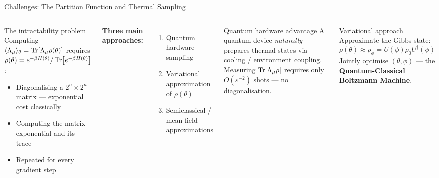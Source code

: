 \documentclass[aspectratio=169,10pt]{beamer}
\begin{document}
\begin{frame}{Challenges: The Partition Function and Thermal Sampling}
  \begin{columns}[T]
      \begin{alertblock}{The intractability problem}
        Computing $\langle\Lambda_\mu\rangle_\theta=\Tr[\Lambda_\mu\rho(\theta)]$
        requires $\rho(\theta)=e^{-\beta H(\theta)}/\Tr[e^{-\beta H(\theta)}]$:
        \begin{itemize}\itemsep0pt
          \item Diagonalising a $2^n\times 2^n$ matrix —
                exponential cost classically
          \item Computing the matrix exponential and its trace
          \item Repeated for every gradient step
        \end{itemize}
      \end{alertblock}
      \textbf{Three main approaches:}
      \begin{enumerate}\itemsep0pt
        \item Quantum hardware sampling
        \item Variational approximation of $\rho(\theta)$
        \item Semiclassical / mean-field approximations
      \end{enumerate}
      \begin{block}{Quantum hardware advantage}
        A quantum device \emph{naturally} prepares thermal
        states via cooling / environment coupling.
        Measuring $\Tr[\Lambda_\mu\rho]$ requires only
        $O(\varepsilon^{-2})$ shots — no diagonalisation.
      \end{block}
      \vspace{0.1cm}
      \begin{block}{Variational approach}
        Approximate the Gibbs state:
        \[
          \rho(\theta)\approx\rho_\phi
          = U(\phi)\rho_0 U^\dagger(\phi)
        \]
        Jointly optimise $(\theta,\phi)$ — the
        \textbf{Quantum-Classical Boltzmann Machine}.
      \end{block}
  \end{columns}
\end{frame}
\end{document}
